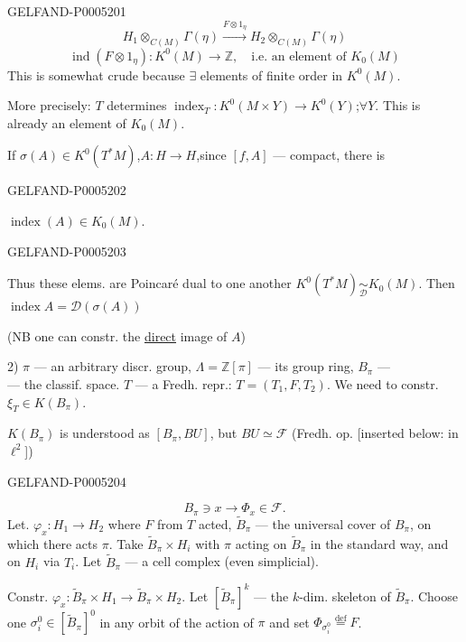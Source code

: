\begin{GelfandAdjacentEvidence}{GELFAND-P000520}{1}
\[
H_1\otimes_{C(M)}\Gamma(\eta)
\overset{F\otimes 1_\eta}{\longrightarrow}
H_2\otimes_{C(M)}\Gamma(\eta)
\]
\[
\operatorname{ind}(F\otimes1_\eta):K^0(M)\to\mathbb Z,
\quad\text{i.e. an element of }K_0(M)
\]
This is somewhat crude because $\exists$ elements of finite order in $K^0(M)$.

More precisely: $T$ determines $\operatorname{index}_T:K^0(M\times Y)\to K^0(Y)$;\quad $\forall Y$.
This is already an element of $K_0(M)$.

If $\sigma(A)\in K^0(T^*M)$,\quad $A:H\to H$,\quad since $[f,A]$ —
compact, there is
\end{GelfandAdjacentEvidence}
\begin{GelfandAdjacentEvidence}{GELFAND-P000520}{2}

$\operatorname{index}(A)\in K_0(M)$.
\end{GelfandAdjacentEvidence}
\begin{GelfandAdjacentEvidence}{GELFAND-P000520}{3}

Thus these elems. are Poincaré dual to one another
$K^0(T^*M)\underset{\mathcal D}{\sim}K_0(M)$.
Then $\operatorname{index}A=\mathcal D(\sigma(A))$

(NB one can constr. the \uline{direct} image of $A$)

2) $\pi$ — an arbitrary discr. group, $\Lambda=\mathbb Z[\pi]$ — its group ring, $B_\pi$ —\\
— the classif. space. $T$ — a Fredh. repr.: $T=(T_1,F,T_2)$. We need to constr.
$\xi_T\in K(B_\pi)$.

$K(B_\pi)$ is understood as $[B_\pi,BU]$, but $BU\simeq\mathcal F$ (Fredh. op. [inserted below: in $\ell^2$])
\end{GelfandAdjacentEvidence}
\begin{GelfandAdjacentEvidence}{GELFAND-P000520}{4}

\[
B_\pi\ni x\to\Phi_x\in\mathcal F.
\]
Let. $\varphi_x:H_1\to H_2$ where $F$ from $T$ acted,
$\widetilde B_\pi$ — the universal cover of $B_\pi$, on which there acts $\pi$.
Take $\widetilde B_\pi\times H_i$ with $\pi$ acting on $\widetilde B_\pi$
in the standard way, and on $H_i$ via $T_i$.
Let $\widetilde B_\pi$ — a cell complex (even simplicial).

Constr. $\varphi_x:\widetilde B_\pi\times H_1\to\widetilde B_\pi\times H_2$.
Let $[\widetilde B_\pi]^k$ — the $k$-dim. skeleton of $\widetilde B_\pi$.
Choose one $\sigma_i^0\in[\widetilde B_\pi]^0$ in any orbit of the action of
$\pi$ and set $\Phi_{\sigma_i^0}\overset{\mathrm{def}}{=}F$.
\end{GelfandAdjacentEvidence}

